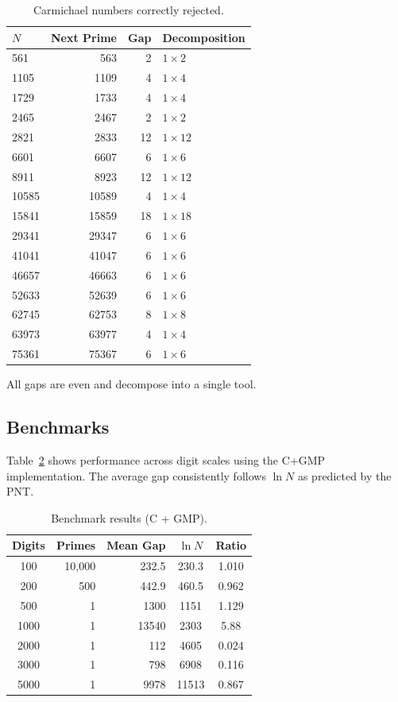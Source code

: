 \documentclass[12pt,a4paper]{article}
\theoremstyle{plain}
\begin{document}
\begin{table}[htbp]
\centering
\caption{Carmichael numbers correctly rejected.}
\label{tab:carmichael}
\begin{tabular}{lrrl}
\hline
$N$ & Next Prime & Gap & Decomposition \\
\hline
561 & 563 & 2 & $1\times2$ \\
1105 & 1109 & 4 & $1\times4$ \\
1729 & 1733 & 4 & $1\times4$ \\
2465 & 2467 & 2 & $1\times2$ \\
2821 & 2833 & 12 & $1\times12$ \\
6601 & 6607 & 6 & $1\times6$ \\
8911 & 8923 & 12 & $1\times12$ \\
10585 & 10589 & 4 & $1\times4$ \\
15841 & 15859 & 18 & $1\times18$ \\
29341 & 29347 & 6 & $1\times6$ \\
41041 & 41047 & 6 & $1\times6$ \\
46657 & 46663 & 6 & $1\times6$ \\
52633 & 52639 & 6 & $1\times6$ \\
62745 & 62753 & 8 & $1\times8$ \\
63973 & 63977 & 4 & $1\times4$ \\
75361 & 75367 & 6 & $1\times6$ \\
\hline
\end{tabular}
\end{table}

All gaps are even and decompose into a single tool.

\subsection{Benchmarks}
\label{sec:bench}

Table~\ref{tab:bench} shows performance across digit scales using the
C+GMP implementation.  The average gap consistently follows
$\ln N$ as predicted by the PNT.

\begin{table}[htbp]
\centering
\caption{Benchmark results (C + GMP).}
\label{tab:bench}
\begin{tabular}{crrcc}
\hline
Digits & Primes & Mean Gap & $\ln N$ & Ratio \\
\hline
100 & 10,000 & 232.5 & 230.3 & 1.010 \\
200 & 500 & 442.9 & 460.5 & 0.962 \\
500 & 1 & 1300 & 1151 & 1.129 \\
1000 & 1 & 13540 & 2303 & 5.88 \\
2000 & 1 & 112 & 4605 & 0.024 \\
3000 & 1 & 798 & 6908 & 0.116 \\
5000 & 1 & 9978 & 11513 & 0.867 \\
\hline
\end{tabular}
\end{table}
\end{document}
